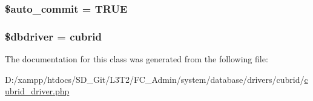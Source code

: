 \subsubsection[{\$auto\+\_\+commit}]{\setlength{\rightskip}{0pt plus 5cm}\$auto\+\_\+commit = T\+R\+U\+E}\label{class_c_i___d_b__cubrid__driver_a2620b91fdfd73aa770c443ad172f1914}
\hypertarget{class_c_i___d_b__cubrid__driver_a0cde2a16322a023d040aa7f725877597}{}
\subsubsection[{\$dbdriver}]{\setlength{\rightskip}{0pt plus 5cm}\$dbdriver = \textquotesingle{}cubrid\textquotesingle{}}\label{class_c_i___d_b__cubrid__driver_a0cde2a16322a023d040aa7f725877597}


The documentation for this class was generated from the following file\+:\begin{DoxyCompactItemize}
\item 
D\+:/xampp/htdocs/\+S\+D\+\_\+\+Git/\+L3\+T2/\+F\+C\+\_\+\+Admin/system/database/drivers/cubrid/\hyperlink{cubrid__driver_8php}{cubrid\+\_\+driver.\+php}\end{DoxyCompactItemize}
